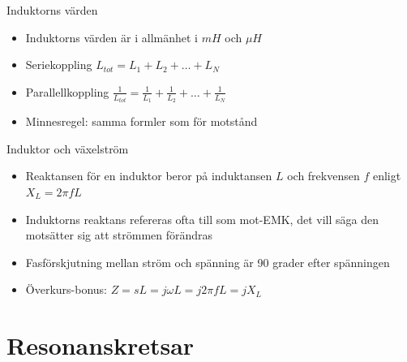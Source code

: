 \documentclass{beamer}
\begin{document}
\begin{frame}{Induktorns värden}
  \begin{itemize}
    \item Induktorns värden är i allmänhet i $mH$ och $\mu H$
    \item Seriekoppling $L_{tot} = L_1 + L_2 + \ldots + L_N$
    \item Parallellkoppling $\frac{1}{L_{tot}} = \frac{1}{L_1} + \frac{1}{L_2} + \ldots + \frac{1}{L_N}$
    \item Minnesregel: samma formler som för motstånd
  \end{itemize}
\end{frame}

\begin{frame}{Induktor och växelström}
  \begin{itemize}
  \item Reaktansen för en induktor beror på induktansen $L$ och frekvensen $f$ enligt $X_L = 2\pi f L$
  \item Induktorns reaktans refereras ofta till som mot-EMK, det vill säga den motsätter sig att strömmen förändras
  \item Fasförskjutning mellan ström och spänning är 90 grader efter spänningen
  \item Överkurs-bonus: $Z = sL = j\omega L = j2\pi f L = jX_L$
  \end{itemize}
\end{frame}

\section{Resonanskretsar}
\end{document}
